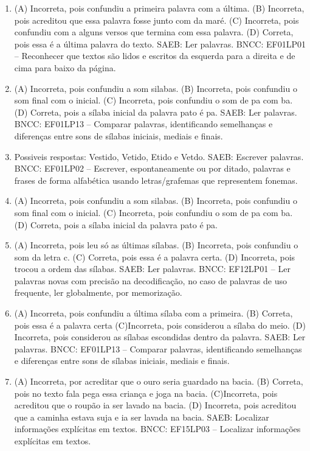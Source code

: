 \begin{enumerate}
\item
(A) Incorreta, pois confundiu a primeira palavra com a última.
(B) Incorreta, pois acreditou que essa palavra fosse junto com da maré.
(C) Incorreta, pois confundiu com a alguns versos que termina com essa palavra.
(D) Correta, pois essa é a última palavra do texto.
SAEB: Ler palavras.
BNCC: EF01LP01 -- Reconhecer que textos são lidos e escritos da esquerda para a
direita e de cima para baixo da página.

\item
(A) Incorreta, pois confundiu a som silabas.
(B) Incorreta, pois confundiu o som final com o inicial.
(C) Incorreta, pois confundiu o som de pa com ba.
(D) Correta, pois a sílaba inicial da palavra pato é pa.
SAEB: Ler palavras.
BNCC: EF01LP13 -- Comparar palavras, identificando semelhanças e
diferenças entre sons de sílabas iniciais, mediais e finais.

\item
Possiveis respostas:
Vestido, Vetido, Etido e Vetdo. SAEB: Escrever palavras.
BNCC: EF01LP02 -- Escrever, espontaneamente ou por ditado, palavras e frases de
forma alfabética usando letras/grafemas que representem fonemas.

\item
(A) Incorreta, pois confundiu a som silabas.
(B) Incorreta, pois confundiu o som final com o inicial.
(C) Incorreta, pois confundiu o som de pa com ba.
(D) Correta, pois a sílaba inicial da palavra pato é pa.

\item
(A) Incorreta, pois leu só as últimas sílabas.
(B) Incorreta, pois confundiu o som da letra c.
(C) Correta, pois essa é a palavra certa.
(D) Incorreta, pois trocou a ordem das sílabas.
SAEB: Ler palavras.
BNCC: EF12LP01 -- Ler palavras novas com precisão na
decodificação, no caso de palavras de uso frequente, ler globalmente,
por memorização.

\item
(A) Incorreta, pois confundiu a última sílaba com a primeira.
(B) Correta, pois essa é a palavra certa
(C)Incorreta, pois considerou a sílaba do meio.
(D) Incorreta, pois considerou as sílabas escondidas dentro da palavra.
SAEB: Ler palavras.
BNCC: EF01LP13 -- Comparar palavras, identificando semelhanças e diferenças entre sons de sílabas iniciais, mediais e finais.

\item
(A) Incorreta, por acreditar que o ouro seria guardado na bacia.
(B) Correta, pois no texto fala pega essa criança e joga na bacia.
(C)Incorreta, pois acreditou que o roupão ia ser lavado na bacia.
(D) Incorreta, pois acreditou que a caminha estava suja e ia ser lavada
na bacia.
SAEB: Localizar informações explícitas em textos.
BNCC: EF15LP03 -- Localizar informações explícitas em textos.


\end{enumerate}
